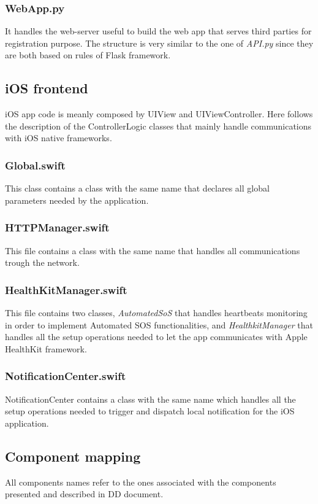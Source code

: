 \documentclass{article}
\begin{document}
 \subsubsection{WebApp.py}
 It handles the web-server useful to build the web app that serves third parties for registration purpose. The structure is very similar to the one of \textit{API.py} since they are both based on rules of Flask framework.
 
\subsection{iOS frontend}
iOS app code is meanly composed by UIView and UIViewController. Here follows the description of the ControllerLogic classes that mainly handle communications with iOS native frameworks.

\subsubsection{Global.swift}
This class contains a class with the same name that declares all global parameters needed by the application.

\subsubsection{HTTPManager.swift}
This file contains a class with the same name that handles all communications trough the network.

\subsubsection{HealthKitManager.swift}
This file contains two classes, \textit{AutomatedSoS} that handles heartbeats monitoring in order to implement Automated SOS functionalities, and \textit{HealthkitManager} that handles all the setup operations needed to let the app communicates with Apple HealthKit framework.

\subsubsection{NotificationCenter.swift}
NotificationCenter contains a class with the same name which handles all the setup operations needed to trigger and dispatch local notification for the iOS application.


\subsection{Component mapping}
All components names refer to the ones associated with the components presented and described in DD document.
\end{document}
